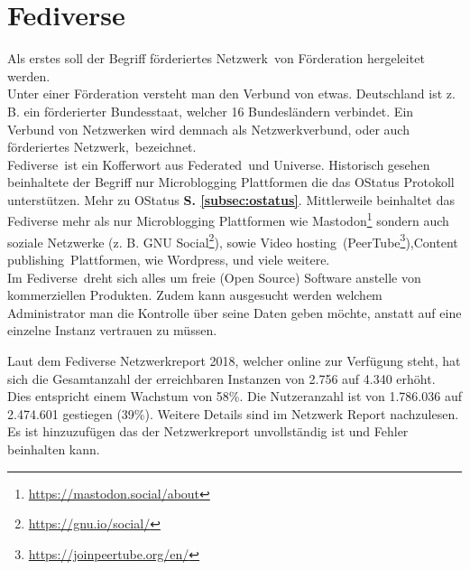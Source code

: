 \section{Fediverse}
	Als erstes soll der Begriff \glqq förderiertes Netzwerk\grqq~von Förderation hergeleitet werden.\\
	
	Unter einer Förderation versteht man den Verbund von etwas. Deutschland ist z. B. ein förderierter Bundesstaat, welcher 16 Bundesländern verbindet. Ein Verbund von Netzwerken wird demnach als Netzwerkverbund, oder auch \glqq förderiertes Netzwerk\grqq,~bezeichnet.\\
	
	\glqq Fediverse\grqq~ist ein Kofferwort aus \glqq Federated\grqq~und \glqq Universe\grqq. Historisch gesehen beinhaltete der Begriff nur Microblogging Plattformen die das OStatus Protokoll unterstützen. Mehr zu OStatus \textbf{S. \ref{subsec:ostatus}}. Mittlerweile beinhaltet das Fediverse mehr als nur Microblogging Plattformen wie Mastodon\footnote{\url{https://mastodon.social/about}} sondern auch soziale Netzwerke (z. B. GNU Social\footnote{\url{https://gnu.io/social/}}), sowie \glqq Video hosting\grqq~(PeerTube\footnote{\url{https://joinpeertube.org/en/}}),\glqq Content publishing\grqq~Plattformen, wie Wordpress, und viele weitere.\cite{fediverse}\\
	
	Im \glqq Fediverse\grqq~dreht sich alles um freie (Open Source) Software anstelle von kommerziellen Produkten. Zudem kann ausgesucht werden welchem Administrator man die Kontrolle über seine Daten geben möchte, anstatt auf eine einzelne Instanz vertrauen zu müssen.\cite{fediverse}\\
	
	Laut dem Fediverse Netzwerkreport 2018, welcher online zur Verfügung steht, hat sich die Gesamtanzahl der erreichbaren Instanzen von 2.756 auf 4.340 erhöht. Dies entspricht einem Wachstum von 58\%. Die Nutzeranzahl ist von 1.786.036 auf 2.474.601 gestiegen (39\%). Weitere Details sind im Netzwerk Report nachzulesen. Es ist hinzuzufügen das der Netzwerkreport unvollständig ist und Fehler beinhalten kann.\cite{fediverse-report}\\